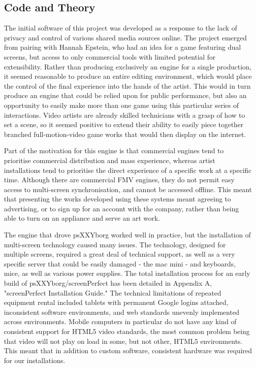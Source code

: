 \subsection{Code and Theory}
The initial software of this project was developed as a response to the lack of privacy and control of various shared media sources online. The project emerged from pairing with Hannah Epstein, who had an idea for a game featuring dual screens, but access to only commercial tools with limited potential for extensibility. Rather than producing exclusively an engine for a single production, it seemed reasonable to produce an entire editing environment, which would place the control of the final experience into the hands of the artist. This would in turn produce an engine that could be relied upon for public performance, but also an opportunity to easily make more than one game using this particular series of interactions. Video artists are already skilled technicians with a grasp of how to set a scene, so it seemed positive to extend their ability to easily piece together branched full-motion-video game works that would then display on the internet. 

Part of the motivation for this engine is that commercial engines tend to prioritise commercial distribution and mass experience, whereas artist installations tend to prioritise the direct experience of a specific work at a specific time. Although there are commercial FMV engines, they do not permit easy access to multi-screen synchronisation, and cannot be accessed offline. This meant that presenting the works developed using these systems meant agreeing to advertising, or to sign up for an account with the company, rather than being able to turn on an appliance and serve an art work.

The engine that drove psXXYborg worked well in practice, but the installation of multi-screen technology caused many issues. The technology, designed for multiple screens, required a great deal of technical support, as well as a very specific server that could be easily damaged - the mac mini - and keyboards, mice, as well as various power supplies. The total installation process for an early build of psXXYborg/screenPerfect has been detailed in Appendix A, "screenPerfect Installation Guide." The technical limitations of repeated equipment rental included tablets with permanent Google logins attached, inconsistent software environments, and web standards unevenly implemented across environments. Mobile computers in particular do not have any kind of consistent support for HTML5 video standards, the most common problem being that video will not play on load in some, but not other, HTML5 environments. This meant that in addition to custom software, consistent hardware was required for our installations.

